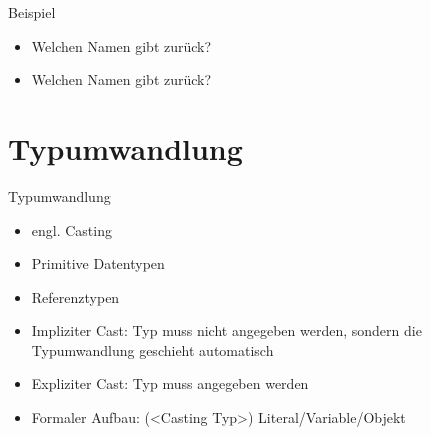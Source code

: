 \documentclass{../tuda-beamer}
\begin{document}
    \begin{frame}[c]{Beispiel}
        
    \end{frame}

    \begin{frame}[c]
        \begin{itemize}
            \item Welchen Namen gibt  zurück?
            \item Welchen Namen gibt  zurück?
        \end{itemize}

        
    \end{frame}


    \section{Typumwandlung}
    \begin{frame}{Typumwandlung}
        \begin{itemize}
            \item engl. Casting
            \item Primitive Datentypen
            \item Referenztypen
            \item Impliziter Cast: Typ muss nicht angegeben werden, sondern die Typumwandlung
            geschieht automatisch
            \item Expliziter Cast: Typ muss angegeben werden
            \item Formaler Aufbau: (<Casting Typ>) Literal/Variable/Objekt
        \end{itemize}
    \end{frame}
\end{document}
